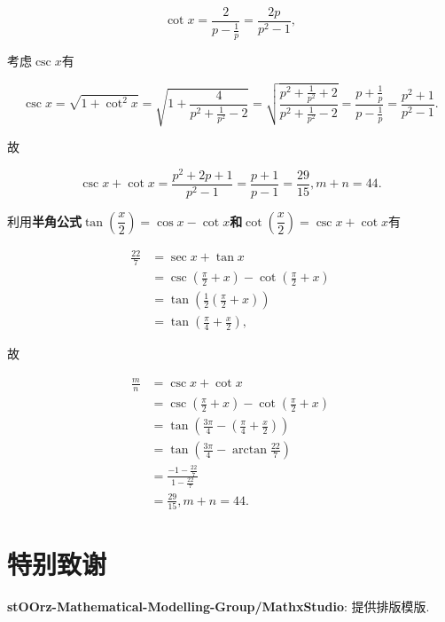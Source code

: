 \documentclass[8pt]{article}
\begin{document}
\begin{enumerate}
						$$\cot x = \frac{2}{p - \frac{1}{p}} = \frac{2p}{p^2 - 1},$$

						考虑$\csc x$有

						$$\csc x = \sqrt{1 + \cot^2 x} = \sqrt{1+\frac{4}{p^2 + \frac{1}{p^2} - 2}} = \sqrt{\frac{p^2 + \frac{1}{p^2} + 2}{p^2 + \frac{1}{p^2} - 2}} = \frac{p+\frac{1}{p}}{p-\frac{1}{p}} = \frac{p^2 + 1}{p^2 - 1}.$$

						故

						$$\csc x + \cot x = \frac{p^2 + 2p + 1}{p^2 - 1} = \frac{p + 1}{p - 1} = \frac{29}{15}, m + n = 44.$$

						 利用\textbf{\textcolor{allandarkblue}{半角公式$\tan\left(\dfrac{x}{2}\right) = \cos x - \cot x$和$\cot \left(\dfrac{x}{2}\right) = \csc x + \cot x$}}有

						\begin{align*}
							\frac{22}{7} &= \sec x + \tan x\\
							&= \csc \left(\frac{\pi}{2} + x \right) - \cot \left(\frac{\pi}{2} + x \right)\\
							&= \tan \left(\frac{1}{2} \left(\frac{\pi}{2} + x\right)\right)\\
							&= \tan \left(\frac{\pi}{4} + \frac{x}{2} \right),
						\end{align*}

						故

						\begin{align*}
							\frac{m}{n} &= \csc x + \cot x\\
							&= \csc \left(\frac{\pi}{2} + x \right) - \cot \left(\frac{\pi}{2} + x\right)\\
							&= \tan \left(\frac{3\pi}{4} - \left(\frac{\pi}{4} + \frac{x}{2}\right)\right)\\
							&= \tan \left(\frac{3\pi}{4} - \arctan \frac{22}{7}\right)\\
							&= \frac{-1 - \frac{22}{7}}{1 - \frac{22}{7}}\\
							&= \frac{29}{15}, m + n = 44.
						\end{align*}

				\end{enumerate} 

	\section{特别致谢}
		\textbf{\textcolor{allangreen}{stOOrz-Mathematical-Modelling-Group/MathxStudio}}: 提供排版模版.
\end{document}
